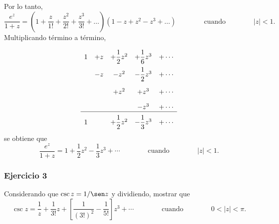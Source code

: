 \documentclass[a4paper]{report}
\begin{document}
Por lo tanto,
\[
 \frac{e^z}{1+z}=\left(1+\frac{z}{1!}+\frac{z^2}{2!}+\frac{z^3}{3!}+\dots\right)\left(1-z+z^2-z^3+\dots\right)
 \qquad\qquad\textrm{cuando}\qquad\qquad
 |z|<1.
\]
Multiplicando término a término,
\[
\setlength\extrarowheight{10pt}
\begin{array}[t]{ccccc}
 1 & +z & +\dfrac{1}{2}z^2 & +\dfrac{1}{6}z^3&+\cdots\\
   & -z & -z^2             & -\dfrac{1}{2}z^3 &+\cdots\\
   &    & +z^2             &             +z^3 &+\cdots\\
   &    &                  &             -z^3 &+\cdots\\   
\cline{1-5}
 1 &    & +\dfrac{1}{2}z^2 & -\dfrac{1}{3}z^3&+\cdots
\end{array}
\]
se obtiene que 
\[
 \frac{e^z}{1+z}=1+\frac{1}{2}z^2-\frac{1}{3}z^3+\cdots
 \qquad\qquad\textrm{cuando}\qquad\qquad
 |z|<1.
\]

\subsubsection*{Ejercicio 3}

Considerando que \(\csc z=1/\sen z\) y dividiendo, mostrar que
\[
 \csc z=\frac{1}{z}+\frac{1}{3!}z+\left[\frac{1}{(3!)^2}-\frac{1}{5!}\right]z^3+\cdots
 \qquad\qquad\textrm{cuando}\qquad\qquad
 0<|z|<\pi.
\]
\end{document}
